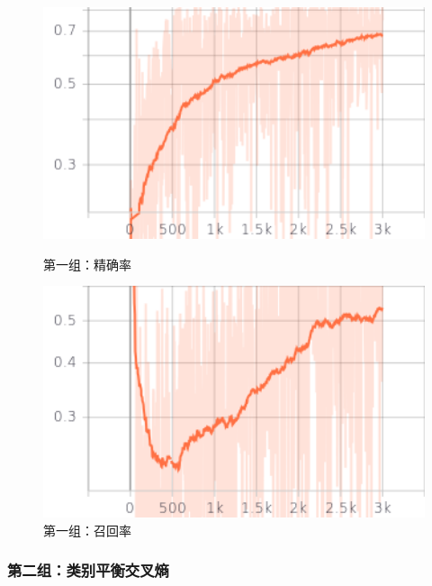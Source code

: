 \begin{figure}[htbp]
    
    \centering
    \begin{minipage}[t]{0.49\textwidth}
        \centering
        \includegraphics[width=1\textwidth]{Figures/图表/交叉熵/precision.png}
        \caption{第一组：精确率}
        \label{Fig:g1_f5}
    \end{minipage}
    \begin{minipage}[t]{0.49\textwidth}
        \centering
        \includegraphics[width=1\textwidth]{Figures/图表/交叉熵/recall.png}
        \caption{第一组：召回率}
        \label{Fig:g1_f6}
    \end{minipage}
    
\end{figure}

\subsubsection{第二组：类别平衡交叉熵}

